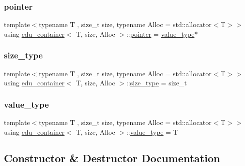 \subsubsection{\texorpdfstring{pointer}{pointer}}
{\footnotesize\ttfamily template$<$typename T , size\+\_\+t size, typename Alloc  = std\+::allocator$<$\+T$>$$>$ \\
using \hyperlink{classedu__container}{edu\+\_\+container}$<$ T, size, Alloc $>$\+::\hyperlink{classedu__container_a20f66877e7a564cb76a3f7d5a5f6ff59}{pointer} =  \hyperlink{classedu__container_a1a1a693013d3f6fd261d6e3532ec2a11}{value\+\_\+type}$\ast$}

\mbox{\label{classedu__container_a2a83d6329e026dd119b001b0e0d9c9f5}} 
\subsubsection{\texorpdfstring{size\+\_\+type}{size\_type}}
{\footnotesize\ttfamily template$<$typename T , size\+\_\+t size, typename Alloc  = std\+::allocator$<$\+T$>$$>$ \\
using \hyperlink{classedu__container}{edu\+\_\+container}$<$ T, size, Alloc $>$\+::\hyperlink{classedu__container_a2a83d6329e026dd119b001b0e0d9c9f5}{size\+\_\+type} =  size\+\_\+t}

\mbox{\label{classedu__container_a1a1a693013d3f6fd261d6e3532ec2a11}} 
\subsubsection{\texorpdfstring{value\+\_\+type}{value\_type}}
{\footnotesize\ttfamily template$<$typename T , size\+\_\+t size, typename Alloc  = std\+::allocator$<$\+T$>$$>$ \\
using \hyperlink{classedu__container}{edu\+\_\+container}$<$ T, size, Alloc $>$\+::\hyperlink{classedu__container_a1a1a693013d3f6fd261d6e3532ec2a11}{value\+\_\+type} =  T}



\subsection{Constructor \& Destructor Documentation}
\mbox{\label{classedu__container_a4facfaba4cbdd4b8845e05f7b29dfc46}} 

